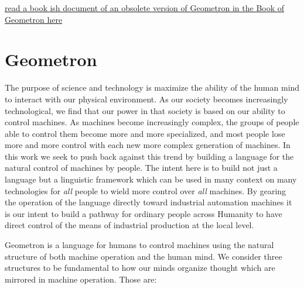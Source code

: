 \href{https://lafelabs.github.io/book_of_geometron.html}{read a book ish
document of an obsolete version of Geometron in the Book of Geometron
here}

\section{Geometron}\label{geometron}

The purpose of science and technology is maximize the ability of the
human mind to interact with our physical environment. As our society
becomes increasingly technological, we find that our power in that
society is based on our ability to control machines. As machines become
increasingly complex, the groups of people able to control them become
more and more specialized, and most people lose more and more control
with each new more complex generation of machines. In this work we seek
to push back against this trend by building a language for the natural
control of machines by people. The intent here is to build not just a
language but a linguistic framework which can be used in many context on
many technologies for \emph{all} people to wield more control over
\emph{all} machines. By gearing the operation of the language directly
toward industrial automation machines it is our intent to build a
pathway for ordinary people across Humanity to have direct control of
the means of industrial production at the local level.

Geometron is a language for humans to control machines using the natural
structure of both machine operation and the human mind. We consider
three structures to be fundamental to how our minds organize thought
which are mirrored in machine operation. Those are:

